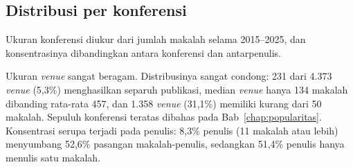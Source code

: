 \subsection{Distribusi per konferensi}
\label{sec:hasil-konferensi}
Ukuran konferensi diukur dari jumlah makalah selama 2015--2025, dan konsentrasinya dibandingkan antara konferensi dan antarpenulis.

Ukuran \textit{venue} sangat beragam. Distribusinya sangat condong: 231 dari 4.373 \textit{venue} (5,3\%) menghasilkan separuh publikasi, median \textit{venue} hanya 134 makalah dibanding rata-rata 457, dan 1.358 \textit{venue} (31,1\%) memiliki kurang dari 50 makalah. Sepuluh konferensi teratas dibahas pada Bab~\ref{chap:popularitas}. Konsentrasi serupa terjadi pada penulis: 8,3\% penulis (11 makalah atau lebih) menyumbang 52,6\% pasangan makalah-penulis, sedangkan 51,4\% penulis hanya menulis satu makalah.

